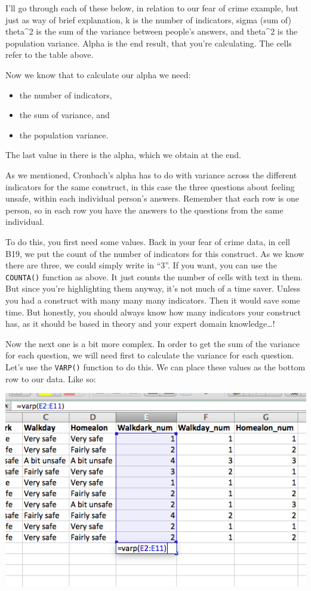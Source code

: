 \documentclass[
]{book}
\providecommand{\tightlist}{%
  \setlength{\itemsep}{0pt}\setlength{\parskip}{0pt}}
\begin{document}
I'll go through each of these below, in relation to our fear of crime example, but just as way of brief explanation, k is the number of indicators, sigma (sum of) theta\^{}2 is the sum of the variance between people's answers, and theta\^{}2 is the population variance. Alpha is the end result, that you're calculating. The cells refer to the table above.

Now we know that to calculate our alpha we need:

\begin{itemize}
\tightlist
\item
  the number of indicators,
\item
  the sum of variance, and
\item
  the population variance.
\end{itemize}

The last value in there is the alpha, which we obtain at the end.

As we mentioned, Cronbach's alpha has to do with variance across the different indicators for the same construct, in this case the three questions about feeling unsafe, within each individual person's answers. Remember that each row is one person, so in each row you have the answers to the questions from the same individual.

To do this, you first need some values. Back in your fear of crime data, in cell B19, we put the count of the number of indicators for this construct. As we know there are three, we could simply write in ``3''. If you want, you can use the \texttt{COUNTA()} function as above. It just counts the number of cells with text in them. But since you're highlighting them anyway, it's not much of a time saver. Unless you had a construct with many many many indicators. Then it would save some time. But honestly, you should always know how many indicators your construct has, as it should be based in theory and your expert domain knowledge\ldots!

Now the next one is a bit more complex. In order to get the sum of the variance for each question, we will need first to calculate the variance for each question. Let's use the \texttt{VARP()} function to do this. We can place these values as the bottom row to our data. Like so:

\includegraphics{imgs/varp_alpha.png}
\end{document}
